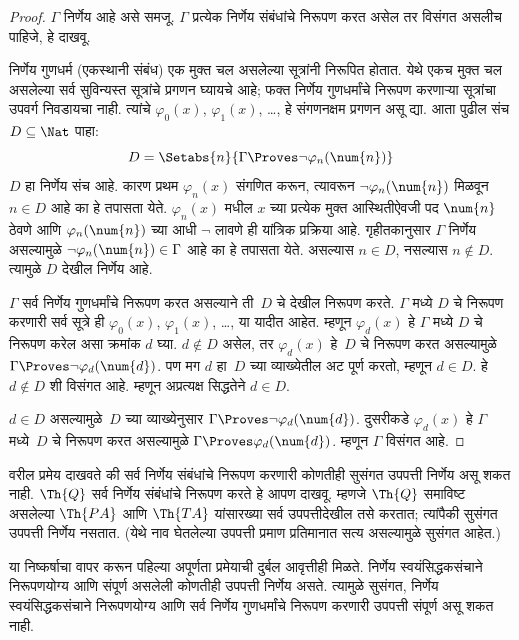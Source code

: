 \begin{proof}
$\Gamma$ निर्णेय आहे असे समजू. $\Gamma$ प्रत्येक
निर्णेय संबंधांचे निरूपण करत असेल तर विसंगत असलीच
पाहिजे, हे दाखवू.

निर्णेय गुणधर्म (एकस्थानी संबंध) एक मुक्त चल असलेल्या
सूत्रांनी निरूपित होतात. येथे एकच मुक्त चल असलेल्या सर्व
सुविन्यस्त सूत्रांचे प्रगणन घ्यायचे आहे; फक्त निर्णेय गुणधर्मांचे
निरूपण करणाऱ्या सूत्रांचा उपवर्ग निवडायचा नाही. त्यांचे
$\varphi_0(x)$, $\varphi_1(x)$, \dots, हे संगणनक्षम प्रगणन असू द्या.
आता पुढील संच $D \subseteq \Nat$ पाहा:
\[D = \Setabs{n}{\Gamma \Proves \lnot \varphi_n(\num{n})}
\]
$D$ हा निर्णेय संच आहे. कारण प्रथम $\varphi_n(x)$ संगणित
करून, त्यावरून $\lnot \varphi_n(\num{n})$ मिळवून $n \in D$
आहे का हे तपासता येते. $\varphi_n(x)$ मधील $x$ च्या प्रत्येक मुक्त
आस्थितीऐवजी पद $\num{n}$ ठेवणे आणि $\varphi_n(\num{n})$ च्या
आधी $\lnot$ लावणे ही यांत्रिक प्रक्रिया आहे. गृहीतकानुसार
$\Gamma$ निर्णेय असल्यामुळे
$\lnot \varphi_n(\num{n}) \in \Gamma$ आहे का हे तपासता येते.
असल्यास $n \in D$, नसल्यास $n \notin D$. त्यामुळे $D$
देखील निर्णेय आहे.

$\Gamma$ सर्व निर्णेय गुणधर्मांचे निरूपण करत
असल्याने ती~$D$ चे देखील निरूपण करते. $\Gamma$ मध्ये
$D$ चे निरूपण करणारी सर्व सूत्रे ही $\varphi_0(x)$,
$\varphi_1(x)$, \dots, या यादीत आहेत. म्हणून $\varphi_d(x)$ हे
$\Gamma$ मध्ये $D$ चे निरूपण करेल असा क्रमांक $d$
घ्या. $d
\notin D$ असेल, तर $\varphi_d(x)$ हे~$D$ चे निरूपण
करत असल्यामुळे $\Gamma \Proves
\lnot \varphi_d(\num{d})$. पण मग $d$ हा~$D$ च्या व्याख्येतील
अट पूर्ण करतो, म्हणून $d \in D$. हे $d \notin D$ शी
विसंगत आहे. म्हणून अप्रत्यक्ष सिद्धतेने $d \in D$.

$d \in D$ असल्यामुळे~$D$ च्या व्याख्येनुसार $\Gamma \Proves \lnot
\varphi_d(\num{d})$. दुसरीकडे $\varphi_d(x)$ हे $\Gamma$ मध्ये~$D$ चे
निरूपण करत असल्यामुळे $\Gamma \Proves \varphi_d(\num{d})$.
म्हणून $\Gamma$ विसंगत आहे.
\end{proof}

\begin{explain}
वरील प्रमेय दाखवते की सर्व निर्णेय संबंधांचे निरूपण
करणारी कोणतीही सुसंगत उपपत्ती निर्णेय असू शकत नाही.
$\Th{Q}$ सर्व निर्णेय संबंधांचे निरूपण करते हे
आपण दाखवू. म्हणजे $\Th{Q}$ समाविष्ट असलेल्या $\Th{PA}$
आणि $\Th{TA}$ यांसारख्या सर्व उपपत्तीदेखील तसे करतात; त्यांपैकी
सुसंगत उपपत्ती निर्णेय नसतात. (येथे नाव घेतलेल्या उपपत्ती
प्रमाण प्रतिमानात सत्य असल्यामुळे सुसंगत आहेत.)

या निष्कर्षाचा वापर करून पहिल्या अपूर्णता प्रमेयाची दुर्बल आवृत्तीही
मिळते. निर्णेय स्वयंसिद्धकसंचाने निरूपणयोग्य आणि संपूर्ण असलेली कोणतीही
उपपत्ती निर्णेय असते. त्यामुळे सुसंगत, निर्णेय स्वयंसिद्धकसंचाने निरूपणयोग्य
आणि सर्व निर्णेय गुणधर्मांचे निरूपण करणारी उपपत्ती
संपूर्ण असू शकत नाही.
\end{explain}

